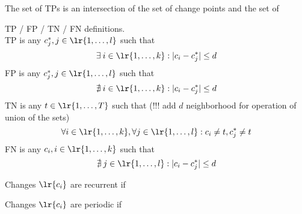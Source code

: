 \begin{definition}
    The set of TPs is an intersection of the set of change points and the set of 
\end{definition}
TP / FP / TN / FN definitions.\\
TP is any $c_j^\ast, j \in \lr{ 1,\dots,l }$ such that 
\[
\exists \: i \in \lr{ 1,\dots, k } : |c_i - c_j^\ast| \leq d
\]
FP is any $c_j^\ast, j \in \lr{ 1,\dots,l }$ such that
\[
\nexists \: i \in \lr{ 1,\dots,k } : |c_i - c_j^\ast| \leq d
\]
TN is any $t \in \lr{ 1,\dots,T }$ such that (!!! add $d$ neighborhood for operation of union of the sets)
\[
\forall i \in \lr{ 1,\dots,k }, \forall j \in \lr{ 1,\dots,l}: c_i \neq t , c_j^\ast \neq t 
\]
FN is any $c_i, i \in \lr{ 1,\dots,k }$ such that  
\[
\nexists \: j \in \lr{ 1,\dots,l } : |c_i - c_j^\ast| \leq d
\]

\begin{definition}
Changes $\lr{c_i}$ are recurrent if 
\end{definition}
\begin{definition}
Changes $\lr{c_i}$ are periodic if 
\end{definition}
%

